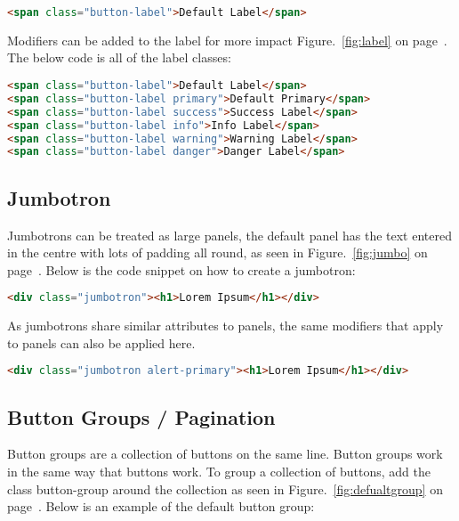\begin{lstlisting}[language=HTML]
<span class="button-label">Default Label</span>
\end{lstlisting}

Modifiers can be added to the label for more impact Figure.~\ref{fig:label} on  page~\pageref{fig:label}. The below code is all of the label classes:

\begin{lstlisting}[language=HTML]
<span class="button-label">Default Label</span>
<span class="button-label primary">Default Primary</span>
<span class="button-label success">Success Label</span>
<span class="button-label info">Info Label</span>
<span class="button-label warning">Warning Label</span>
<span class="button-label danger">Danger Label</span>
\end{lstlisting}

\newpage
\subsection*{Jumbotron}
Jumbotrons can be treated as large panels, the default panel has the text entered in the centre with lots of padding all round, as seen in Figure.~\ref{fig:jumbo} on  page~\pageref{fig:jumbo}. Below is the code snippet on how to create a jumbotron: 

\begin{lstlisting}[language=HTML]
<div class="jumbotron"><h1>Lorem Ipsum</h1></div>
\end{lstlisting}

As jumbotrons share similar attributes to panels, the same modifiers that apply to panels can also be applied here. 

\begin{lstlisting}[language=HTML]
<div class="jumbotron alert-primary"><h1>Lorem Ipsum</h1></div>
\end{lstlisting}

\subsection*{Button Groups / Pagination}
Button groups are a collection of buttons on the same line. Button groups work in the same way that buttons work. To group a collection of buttons, add the class button-group around the collection as seen in Figure.~\ref{fig:defualtgroup} on  page~\pageref{fig:defualtgroup}. Below is an example of the default button group: 

